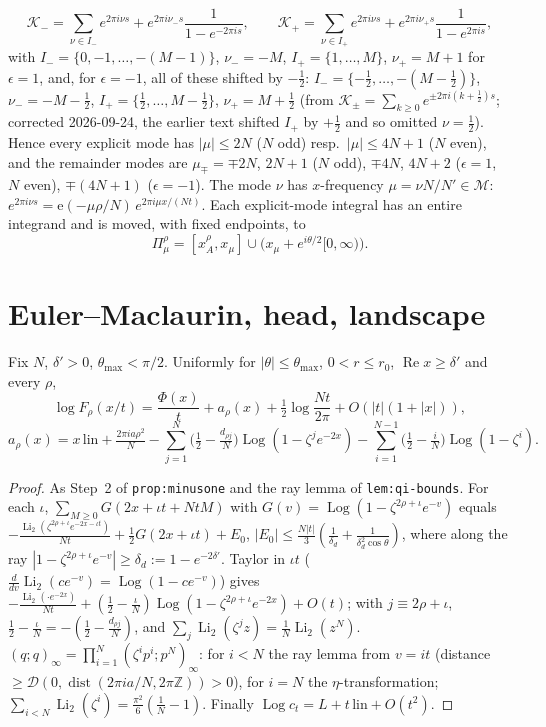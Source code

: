 \documentclass[11pt]{article}
\theoremstyle{definition}\newtheorem{definition}[theorem]{Definition}
\theoremstyle{remark}\newtheorem{remark}[theorem]{Remark}
\newcommand{\e}{\mathrm{e}}
\newcommand{\Li}{\operatorname{Li}_2}
\begin{document}
\[\mathcal K_-=\sum_{\nu\in I_-}e^{2\pi i\nu s}+e^{2\pi i\nu_-s}\frac{1}{1-e^{-2\pi is}},\qquad \mathcal K_+=\sum_{\nu\in I_+}e^{2\pi i\nu s}+e^{2\pi i\nu_+s}\frac{1}{1-e^{2\pi is}},\]
with $I_-=\{0,-1,\dots,-(M-1)\}$, $\nu_-=-M$, $I_+=\{1,\dots,M\}$, $\nu_+=M+1$ for $\epsilon=1$, and, for $\epsilon=-1$, all of these shifted by $-\frac12$: $I_-=\{-\frac12,\dots,-(M-\frac12)\}$, $\nu_-=-M-\frac12$, $I_+=\{\frac12,\dots,M-\frac12\}$, $\nu_+=M+\frac12$ (from $\mathcal K_\pm=\sum_{k\ge0}e^{\pm2\pi i(k+\frac12)s}$; corrected 2026-09-24, the earlier text shifted $I_+$ by $+\frac12$ and so omitted $\nu=\frac12$). Hence every explicit mode has $|\mu|\le2N$ ($N$ odd) resp.\ $|\mu|\le4N+1$ ($N$ even), and the remainder modes are $\mu_\mp=\mp2N$, $2N+1$ ($N$ odd), $\mp4N$, $4N+2$ ($\epsilon=1$, $N$ even), $\mp(4N+1)$ ($\epsilon=-1$). The mode $\nu$ has $x$-frequency $\mu=\nu N/N'\in\mathcal M$: $e^{2\pi i\nu s}=\e(-\mu\rho/N)\,e^{2\pi i\mu x/(Nt)}$. Each explicit-mode integral has an entire integrand and is moved, with fixed endpoints, to
\[\Pi^\rho_\mu=[x_A^\rho,x_\mu]\cup\big(x_\mu+e^{i\theta/2}[0,\infty)\big).\]

\section{Euler--Maclaurin, head, landscape}\label{sec:est}
\begin{lemma}[EM; PROVED]\label{lem:EM}
Fix $N$, $\delta'>0$, $\theta_{\max}<\pi/2$. Uniformly for $|\theta|\le\theta_{\max}$, $0<r\le r_0$, $\operatorname{Re}x\ge\delta'$ and every $\rho$,
\[\log F_\rho(x/t)=\frac{\Phi(x)}t+a_\rho(x)+\tfrac12\log\frac{Nt}{2\pi}+O(|t|(1+|x|)),\]
\[a_\rho(x)=x\,\mathrm{lin}+\tfrac{2\pi ia\rho^2}N-\sum_{j=1}^N\big(\tfrac12-\tfrac{d_{\rho j}}N\big)\operatorname{Log}(1-\zeta^je^{-2x})-\sum_{i=1}^{N-1}\big(\tfrac12-\tfrac iN\big)\operatorname{Log}(1-\zeta^i).\]
\end{lemma}
\begin{proof}
As Step~2 of \texttt{prop:minusone} and the ray lemma of \texttt{lem:qi-bounds}. For each $\iota$, $\sum_{M\ge0}G(2x+\iota t+NtM)$ with $G(v)=\operatorname{Log}(1-\zeta^{2\rho+\iota}e^{-v})$ equals $-\frac{\Li(\zeta^{2\rho+\iota}e^{-2x-\iota t})}{Nt}+\frac12G(2x+\iota t)+E_0$, $|E_0|\le\frac{N|t|}3(\frac1{\delta_d}+\frac1{\delta_d^2\cos\theta})$, where along the ray $|1-\zeta^{2\rho+\iota}e^{-v}|\ge\delta_d:=1-e^{-2\delta'}$. Taylor in $\iota t$ ($\frac{d}{dv}\Li(ce^{-v})=\operatorname{Log}(1-ce^{-v})$) gives $-\frac{\Li(\cdot e^{-2x})}{Nt}+(\frac12-\frac\iota N)\operatorname{Log}(1-\zeta^{2\rho+\iota}e^{-2x})+O(t)$; with $j\equiv2\rho+\iota$, $\frac12-\frac\iota N=-(\frac12-\frac{d_{\rho j}}N)$, and $\sum_{j}\Li(\zeta^jz)=\frac1N\Li(z^N)$. $(q;q)_\infty=\prod_{i=1}^N(\zeta^ip^i;p^N)_\infty$: for $i<N$ the ray lemma from $v=it$ (distance $\ge\mathcal D(0,\operatorname{dist}(2\pi i a/N,2\pi\mathbb Z))>0$), for $i=N$ the $\eta$-transformation; $\sum_{i<N}\Li(\zeta^i)=\frac{\pi^2}6(\frac1N-1)$. Finally $\operatorname{Log}c_t=L+t\,\mathrm{lin}+O(t^2)$.
\end{proof}
\end{document}
